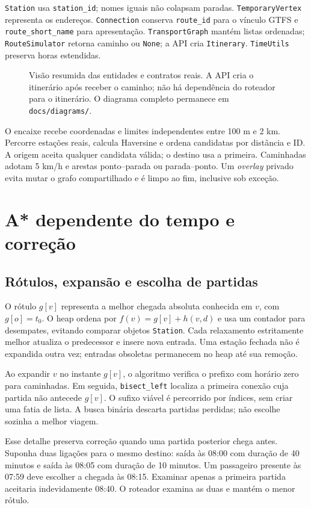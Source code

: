 \documentclass[12pt]{article}
\newcommand{\code}[1]{\texttt{#1}}
\begin{document}
\code{Station} usa \code{station\_id}; nomes iguais não colapsam paradas. \code{TemporaryVertex} representa os endereços. \code{Connection} conserva \code{route\_id} para o vínculo GTFS e \code{route\_short\_name} para apresentação. \code{TransportGraph} mantém listas ordenadas; \code{RouteSimulator} retorna caminho ou \code{None}; a API cria \code{Itinerary}. \code{TimeUtils} preserva horas estendidas.

\begin{figure}[ht]
\centering

\caption{Visão resumida das entidades e contratos reais. A API cria o itinerário após receber o caminho; não há dependência do roteador para o itinerário. O diagrama completo permanece em \texttt{docs/diagrams/}.}
\label{fig:classes}
\end{figure}

O encaixe recebe coordenadas e limites independentes entre 100 m e 2 km. Percorre estações reais, calcula Haversine e ordena candidatas por distância e ID. A origem aceita qualquer candidata válida; o destino usa a primeira. Caminhadas adotam 5 km/h e arestas ponto--parada ou parada--ponto. Um \emph{overlay} privado evita mutar o grafo compartilhado e é limpo ao fim, inclusive sob exceção.

\section{A* dependente do tempo e correção}
\subsection{Rótulos, expansão e escolha de partidas}
O rótulo $g[v]$ representa a melhor chegada absoluta conhecida em $v$, com $g[o]=t_0$. O heap ordena por $f(v)=g[v]+h(v,d)$ e usa um contador para desempates, evitando comparar objetos \code{Station}. Cada relaxamento estritamente melhor atualiza o predecessor e insere nova entrada. Uma estação fechada não é expandida outra vez; entradas obsoletas permanecem no heap até sua remoção.

Ao expandir $v$ no instante $g[v]$, o algoritmo verifica o prefixo com horário zero para caminhadas. Em seguida, \code{bisect\_left} localiza a primeira conexão cuja partida não antecede $g[v]$. O sufixo viável é percorrido por índices, sem criar uma fatia de lista. A busca binária descarta partidas perdidas; não escolhe sozinha a melhor viagem.

Esse detalhe preserva correção quando uma partida posterior chega antes. Suponha duas ligações para o mesmo destino: saída às 08:00 com duração de 40 minutos e saída às 08:05 com duração de 10 minutos. Um passageiro presente às 07:59 deve escolher a chegada às 08:15. Examinar apenas a primeira partida aceitaria indevidamente 08:40. O roteador examina as duas e mantém o menor rótulo.
\end{document}
